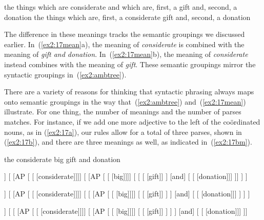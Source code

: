 \begin{exe}
	\ex \label{ex2:17mean}
	\begin{xlist}
	\ex the things which are considerate and which are, first, a gift and, second, a donation
	\ex the things which are, first, a considerate gift and, second, a donation 
	\end{xlist} 
\end{exe}
The difference in these meanings tracks the semantic groupings we discussed earlier. In~(\ref{ex2:17mean}a), the meaning of \emph{considerate} is combined with the meaning of \emph{gift and donation}. In~(\ref{ex2:17mean}b), the meaning of \emph{considerate} instead combines with the meaning of \emph{gift}. These semantic groupings mirror the syntactic groupings in~(\ref{ex2:ambtree}).

There are a variety of reasons for thinking that syntactic phrasing always maps onto semantic groupings in the way that~(\ref{ex2:ambtree}) and~(\ref{ex2:17mean}) illustrate. For one thing, the number of meanings and the number of parses matches. For instance, if we add one more adjective to the left of the co\"ordinated nouns, as in (\ref{ex2:17a}), our rules allow for a total of three parses, shown in (\ref{ex2:17b}), and there are three meanings as well, as indicated in~(\ref{ex2:17bm}).
\begin{exe}
	\ex \label{ex2:17a} the considerate big gift and donation
\end{exe}
\begin{exe}
	\ex \label{ex2:17b}
	\footnotesize 
\begin{forest}
[NP
	[\obar{D} [the]]
	[ 
		[AP [ [ [considerate]]]]
		[ 
			[AP [ [ [big]]]]
			[
			[ [ [gift]] ]
			[and]
			[ [ [donation]]]
		 ]]
	]
]
\end{forest}
\hspace*{-10pt}
\begin{forest}
[NP
	[\obar{D} [the]]
	[ 
		[AP [ [ [considerate]]]]
		[ 
			[ 
				[AP [ [ [big]]]]
				[ [ [gift]] ]
			]
			[and]
			[ [ [donation]]]
		 ]
	]
]
\end{forest}
\hspace*{25pt}
\begin{forest}
[NP
	[\obar{D} [the]]
	[
	[ 
		[AP [ [ [considerate]]]]
		[ 
			[AP [ [ [big]]]]
			[ [ [gift]] ]
		 ]
	]
	[and]
	[ [ [donation]]]
]]
\end{forest}
\end{exe}
